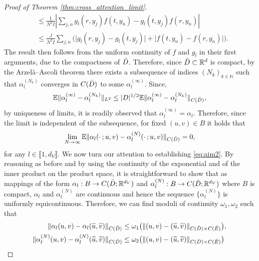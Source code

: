\documentclass[twoside]{article}
\newcommand{\1}{\mathbbm{1}}
\newcommand{\R}{\mathbbm{R}}
\newcommand{\N}{\mathbbm{N}}
\newcommand{\range}[2]{\llbracket #1, #2 \rrbracket}
\newcommand{\ec}[1]{{\color{blue}{#1}}}
\providecommand{\mathbbm}{\mathbb} %
\newcommand{\E}{\mathbb{E}}
\begin{document}
\begin{proof}[Proof of Theorem \ref{thm:cross_attention_limit}]
\begin{subequations}
\begin{align}
            &\leq\frac{1}{N^2I}\left|\sum_{j,n}g_l(r,y_j)f(t,y_n)-g_l(t,y_j)f(r,y_n) \right|\\
            &\leq \frac{J}{N^2I}\sum_{j,n}\bigl(\bigl|g_l(r,y_j)-g_l(t,y_j) \bigr|+\bigl|f(t,y_n)-f(r,y_n)\bigr| \bigr).
        \end{align}
    \end{subequations}
    The result then follows from the uniform continuity of $f$ and $g_l$ in their first arguments, due to the compactness of $\Bar{D}$.
Therefore, since $\Bar{D}\subset\R^d$ is compact, by the Arzel\`a–Ascoli theorem there exists a subsequence of indices $(N_k)_{k\in\N}$ such that $\alpha_l^{(N_k)}$ converges in $C(\Bar{D})$ to some $\alpha_l^{(\infty)}$. Since,
\begin{equation*}
   \E \|\alpha_l^{(\infty)} - \alpha_l^{(N_k)}\|_{L^2} \leq |D|^{1/2}\E \|\alpha_l^{(\infty)} - \alpha_l^{(N_k)}\|_{C(\Bar{D})},
\end{equation*}
by uniqueness of limits, it is readily observed that $\alpha_l^{(\infty)}=\alpha_l$. Therefore, since the limit is independent of the subsequence, for fixed $(u,v)\in B$ it holds that
\[\lim_{N \to \infty} \E \|\alpha_l(\cdot\,;u,v) - \alpha_l^{(N)}(\cdot\,;u,v)\|_{C(\Bar{D})} = 0,\]
for any $l\in\range{1}{d_V}$. We now turn our attention to establishing \eqref{eq:aim2}. By reasoning as before and by using the continuity of the exponential and of the inner product on the product space, it is straightforward to show that as mappings of the form \(\alpha_l:B \to C(\Bar{D};\R^{d_V})\) and \(\alpha_l^{(N)}:B \to C(\Bar{D};\R^{d_V})\) where $B$ is compact, \(\alpha_l\) and \(\alpha_l^{(N)}\) are continuous and hence the sequence \( \{\alpha_l^{(N)}\}\) is uniformly equicontinuous. %
Therefore, we can find moduli of continuity $\omega_1, \omega_2$ such that
\[
\begin{aligned}
\|\alpha_l(u,v) - \alpha_l(\widetilde{u},\widetilde{v})\|_{C(\Bar{D})} &\leq \omega_1 \big ( \|(u,v) - (\widetilde{u},\widetilde{v})\|_{C(\Bar{D})\times C(\Bar{E})} \big ),\\
\|\alpha_l^{(N)}(u,v) - \alpha_l^{(N)}(\widetilde{u},\widetilde{v})\|_{C(\Bar{D})} &\leq \omega_2 \big ( \|(u,v) - (\widetilde{u},\widetilde{v})\|_{C(\Bar{D})\times C(\Bar{E})} \big )

\end{aligned}\]
\end{proof}
\end{document}
